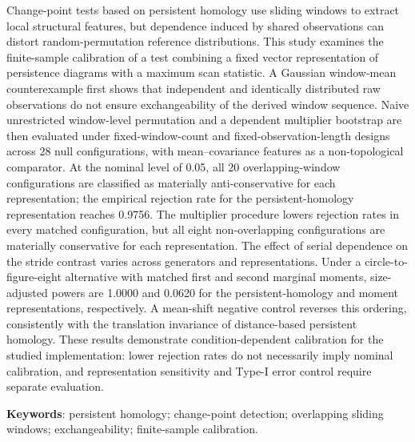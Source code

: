 Change-point tests based on persistent homology use sliding windows to extract local structural features, but dependence induced by shared observations can distort random-permutation reference distributions. This study examines the finite-sample calibration of a test combining a fixed vector representation of persistence diagrams with a maximum scan statistic. A Gaussian window-mean counterexample first shows that independent and identically distributed raw observations do not ensure exchangeability of the derived window sequence. Naive unrestricted window-level permutation and a dependent multiplier bootstrap are then evaluated under fixed-window-count and fixed-observation-length designs across 28 null configurations, with mean--covariance features as a non-topological comparator. At the nominal level of 0.05, all 20 overlapping-window configurations are classified as materially anti-conservative for each representation; the empirical rejection rate for the persistent-homology representation reaches 0.9756. The multiplier procedure lowers rejection rates in every matched configuration, but all eight non-overlapping configurations are materially conservative for each representation. The effect of serial dependence on the stride contrast varies across generators and representations. Under a circle-to-figure-eight alternative with matched first and second marginal moments, size-adjusted powers are 1.0000 and 0.0620 for the persistent-homology and moment representations, respectively. A mean-shift negative control reverses this ordering, consistently with the translation invariance of distance-based persistent homology. These results demonstrate condition-dependent calibration for the studied implementation: lower rejection rates do not necessarily imply nominal calibration, and representation sensitivity and Type-I error control require separate evaluation.

\noindent\textbf{Keywords}: persistent homology; change-point detection; overlapping sliding windows; exchangeability; finite-sample calibration.
